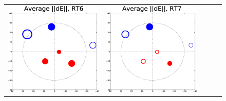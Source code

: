 \documentclass[]{aa}
\begin{document}
\begin{figure}
\begin{tabular}{@{}c@{}c@{}c@{}c@{}c@{}}
\includegraphics[width=\roguewidth]{o2003_dE_ant6} &
\includegraphics[width=\roguewidth]{o2003_dE_ant7} &

\end{tabular}
\end{figure}
\end{document}

